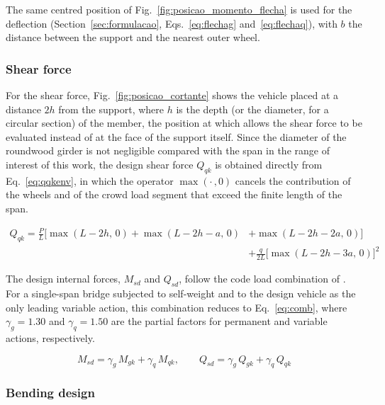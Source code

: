 The same centred position of Fig.~\ref{fig:posicao_momento_flecha} is used for the deflection (Section~\ref{sec:formulacao}, Eqs.~\eqref{eq:flechag} and~\eqref{eq:flechaq}), with $b$ the distance between the support and the nearest outer wheel.

\subsubsection*{Shear force}

For the shear force, Fig.~\ref{fig:posicao_cortante} shows the vehicle placed at a distance $2h$ from the support, where $h$ is the depth (or the diameter, for a circular section) of the member, the position at which \textcite{NBR7190-1:2022} allows the shear force to be evaluated instead of at the face of the support itself.
Since the diameter of the roundwood girder is not negligible compared with the span in the range of interest of this work, the design shear force $Q_{qk}$ is obtained directly from Eq.~\eqref{eq:qqkenv}, in which the operator $\max(\cdot\,,0)$ cancels the contribution of the wheels and of the crowd load segment that exceed the finite length of the span.

\begin{equation}
\begin{split}
Q_{qk} = \frac{P}{L}\Big[\max(L-2h,\,0) + \max(L-2h-a,\,0) &+ \max(L-2h-2a,\,0)\Big] \\
&+ \frac{q}{2L}\Big[\max(L-2h-3a,\,0)\Big]^{2}
\end{split}
\label{eq:qqkenv}
\end{equation}

The design internal forces, $M_{sd}$ and $Q_{sd}$, follow the code load combination of \textcite{NBR8681:2025}.
For a single-span bridge subjected to self-weight and to the design vehicle as the only leading variable action, this combination reduces to Eq.~\eqref{eq:comb}, where $\gamma_g = 1.30$ and $\gamma_q = 1.50$ are the partial factors for permanent and variable actions, respectively.

\begin{equation}
M_{sd} = \gamma_g\,M_{gk} + \gamma_q\,M_{qk}, \qquad Q_{sd} = \gamma_g\,Q_{gk} + \gamma_q\,Q_{qk}
\label{eq:comb}
\end{equation}

\subsubsection{Bending design}

